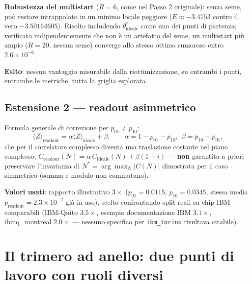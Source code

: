 \documentclass[11pt,a4paper]{article}
\begin{document}
\textbf{Robustezza del multistart} ($R=6$, come nel Passo 2 originale): senza
seme, può restare intrappolato in un minimo locale peggiore
($E\approx-3.4753$ contro il vero $-3.50164605$). Risolto includendo
$\theta^*_\text{ideale}$ come uno dei punti di partenza; verificato
indipendentemente che non è un artefatto del seme, un multistart più ampio
($R=20$, nessun seme) converge allo stesso ottimo rumoroso entro
$2.6\times10^{-6}$.

\textbf{Esito}: nessun vantaggio misurabile dalla riottimizzazione, su
entrambi i punti, entrambe le metriche, tutta la griglia esplorata.

\subsection{Estensione 2 --- readout asimmetrico}

Formula generale di correzione per $p_{01}\neq p_{10}$:
$$\langle Z\rangle_\text{readout}=\alpha\langle Z\rangle_\text{ideale}+\beta,
\qquad \alpha = 1-p_{01}-p_{10},\ \ \beta = p_{10}-p_{01},$$
che per il correlatore complesso diventa una traslazione costante nel piano
complesso, $C_\text{readout}(N)=\alpha\,C_\text{ideale}(N)+\beta(1+i)$ ---
\textbf{non} garantita a priori preservare l'invarianza di
$N^*=\arg\max_N|C(N)|$ dimostrata per il caso simmetrico (somma e modulo non
commutano).

\textbf{Valori usati}: rapporto illustrativo $3\times$ ($p_{01}=0.0115$,
$p_{10}=0.0345$, stessa media $p_\text{readout}=2.3\times10^{-2}$ già in uso),
scelto confrontando split reali su chip IBM comparabili (IBM-Quito
$3.5\times$, esempio documentazione IBM $3.1\times$, ibmq\_montreal
$2.0\times$ --- nessuno specifico per \texttt{ibm\_torino} risultava
citabile).


\section{Il trimero ad anello: due punti di lavoro con ruoli diversi}
\end{document}
